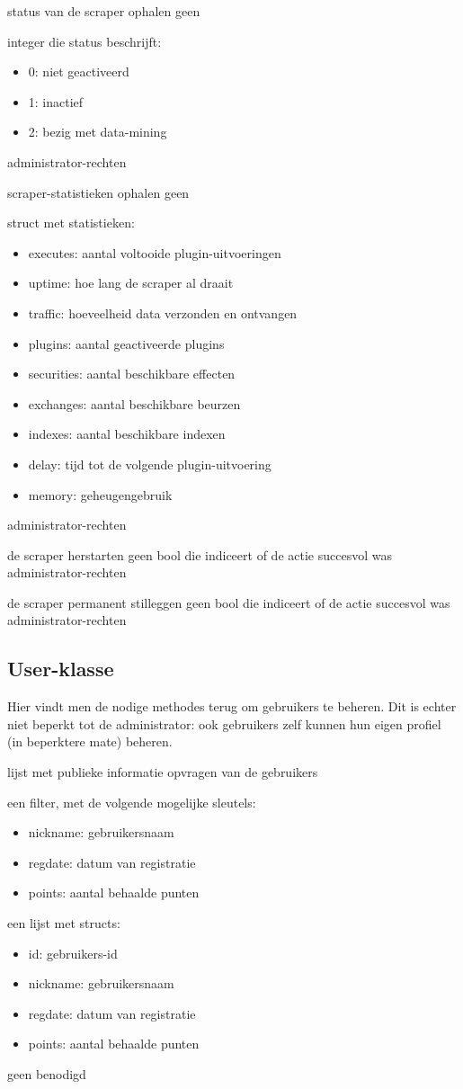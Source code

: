 	{ status van de scraper ophalen }
	{ geen }
	{ integer die status beschrijft:
		\begin{itemize}
		\item{0: niet geactiveerd}
		\item{1: inactief}
		\item{2: bezig met data-mining}
		\end{itemize} }
	{ administrator-rechten }

	{ scraper-statistieken ophalen }
	{ geen }
	{ struct met statistieken:
		\begin{itemize}
		\item{executes: aantal voltooide plugin-uitvoeringen}
		\item{uptime: hoe lang de scraper al draait}
		\item{traffic: hoeveelheid data verzonden en ontvangen}
		\item{plugins: aantal geactiveerde plugins}
		\item{securities: aantal beschikbare effecten}
		\item{exchanges: aantal beschikbare beurzen}
		\item{indexes: aantal beschikbare indexen}
		\item{delay: tijd tot de volgende plugin-uitvoering}
		\item{memory: geheugengebruik}
		\end{itemize} }
	{ administrator-rechten }

	{ de scraper herstarten }
	{ geen }
	{ bool die indiceert of de actie succesvol was }
	{ administrator-rechten }

	{ de scraper permanent stilleggen }
	{ geen }
	{ bool die indiceert of de actie succesvol was }
	{ administrator-rechten }


\subsection{User-klasse}

Hier vindt men de nodige methodes terug om gebruikers te beheren. Dit is echter niet beperkt tot de administrator: ook gebruikers zelf kunnen hun eigen profiel (in beperktere mate) beheren.

	{ lijst met publieke informatie opvragen van de gebruikers }
	{ een filter, met de volgende mogelijke sleutels:
		\begin{itemize}
		\item{nickname: gebruikersnaam}
		\item{regdate: datum van registratie}
		\item{points: aantal behaalde punten}
		\end{itemize} }
	{ een lijst met structs:
		\begin{itemize}
		\item{id: gebruikers-id}
		\item{nickname: gebruikersnaam}
		\item{regdate: datum van registratie}
		\item{points: aantal behaalde punten}
		\end{itemize} }
	{ geen benodigd }

